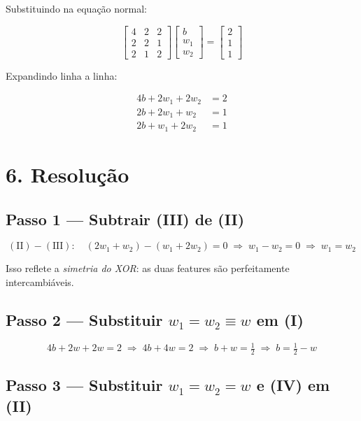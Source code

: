 \documentclass[12pt, a4paper]{article}
\begin{document}
Substituindo na equação normal:

\[
  \begin{bmatrix}
    4 & 2 & 2 \\
    2 & 2 & 1 \\
    2 & 1 & 2
  \end{bmatrix}
  \begin{bmatrix} b \\ w_1 \\ w_2 \end{bmatrix}
  =
  \begin{bmatrix} 2 \\ 1 \\ 1 \end{bmatrix}
\]

\noindent Expandindo linha a linha:

\begin{align}
  4b + 2w_1 + 2w_2 &= 2 \tag{I}  \\
  2b + 2w_1 +  w_2 &= 1 \tag{II} \\
  2b +  w_1 + 2w_2 &= 1 \tag{III}
\end{align}

\section*{6. Resolução}

\subsection*{Passo 1 — Subtrair (III) de (II)}

\[
  (\text{II}) - (\text{III}):\quad
  (2w_1 + w_2) - (w_1 + 2w_2) = 0
  \;\Longrightarrow\;
  w_1 - w_2 = 0
  \;\Longrightarrow\;
  \boxed{w_1 = w_2}
\]

\noindent Isso reflete a \emph{simetria do XOR}: as duas features são perfeitamente intercambiáveis.

\subsection*{Passo 2 — Substituir $w_1 = w_2 \equiv w$ em (I)}

\[
  4b + 2w + 2w = 2
  \;\Longrightarrow\;
  4b + 4w = 2
  \;\Longrightarrow\;
  b + w = \tfrac{1}{2}
  \;\Longrightarrow\;
  b = \tfrac{1}{2} - w \tag{IV}
\]

\subsection*{Passo 3 — Substituir $w_1 = w_2 = w$ e (IV) em (II)}
\end{document}
